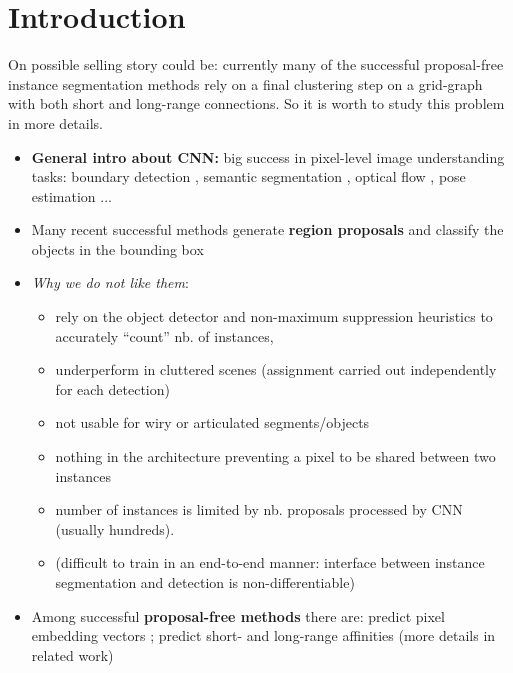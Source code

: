 
\section{Introduction}
On possible selling story could be: currently many of the successful proposal-free instance segmentation methods rely on a final clustering step on a grid-graph with both short and long-range connections. So it is worth to study this problem in more details. 


\begin{itemize}
\item \textbf{General intro about CNN:} big success in pixel-level image understanding tasks: boundary detection \cite{arbelaez2011contour,xie2015holistically,maninis2018convolutional}, semantic segmentation \cite{long2015fully,chen2018deeplab,kong2018recurrent}, optical flow \cite{weinzaepfel2013deepflow,dosovitskiy2015flownet}, pose estimation \cite{wei2016convolutional,cao2017realtime}...
\item Many recent successful methods generate \textbf{region proposals} and classify the objects in the bounding box \cite{yang2012layered,ladicky2010and,hariharan2014simultaneous,chen2015multi,dai2016instance,liang2016reversible,he2017mask}
\item \emph{Why we do not like them}:
\begin{itemize}
\item rely on the object detector and non-maximum suppression heuristics to accurately “count” nb. of instances, 
\item underperform in cluttered scenes (assignment carried out independently for each detection) 
\item not usable for wiry or articulated segments/objects 
\item nothing in the architecture preventing a pixel to be shared between two instances
\item number of instances is limited by nb. proposals processed by CNN (usually hundreds). 
\item (difficult to train in an end-to-end manner: interface between instance segmentation and detection is non-differentiable)
\end{itemize}

\item Among successful \textbf{proposal-free methods} there are: predict pixel embedding vectors \cite{kong2018recurrent,fathi2017semantic,newell2017associative,de2017semantic}; predict short- and long-range affinities \cite{liu2018affinity,wolf2018mutex,xie2015holistically} (more details in related work)


\end{itemize}
